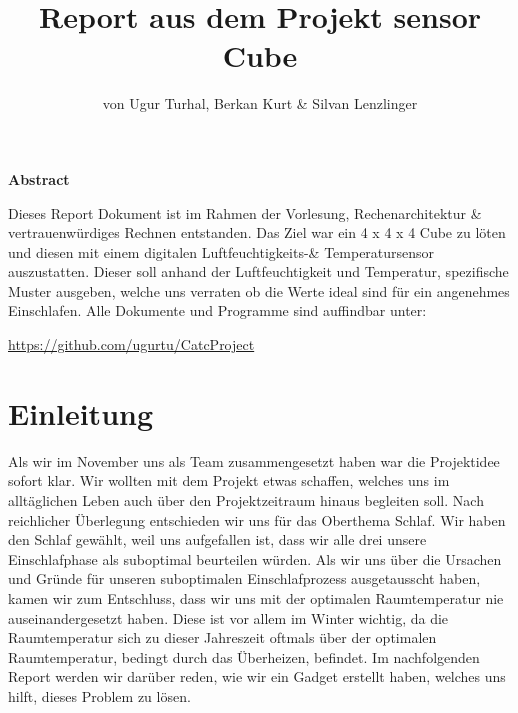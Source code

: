\documentclass{article}
\title{Report aus dem Projekt sensor Cube}
\author{von Ugur Turhal, Berkan Kurt \& Silvan Lenzlinger}
\begin{document}
\maketitle
\tableofcontents
{}
\newpage
\begin{center}
\textbf{Abstract}
\end{center}
Dieses Report Dokument ist im Rahmen der Vorlesung, Rechenarchitektur \& vertrauenwürdiges Rechnen entstanden. Das Ziel war ein 4 x 4 x 4  Cube zu löten und diesen mit einem digitalen Luftfeuchtigkeits-\& Temperatursensor auszustatten.
Dieser soll anhand der Luftfeuchtigkeit und Temperatur, spezifische Muster ausgeben, welche uns verraten ob die Werte ideal sind für ein angenehmes Einschlafen. Alle Dokumente und Programme sind auffindbar unter: \begin{center}
\faGithub \text { }  \url{https://github.com/ugurtu/CatcProject}
\end{center}

\section{Einleitung}
Als wir im November uns als Team zusammengesetzt haben war die Projektidee sofort klar. Wir wollten mit dem Projekt etwas schaffen, welches uns im alltäglichen Leben auch über den Projektzeitraum hinaus begleiten soll.
Nach reichlicher Überlegung entschieden wir uns für das Oberthema Schlaf. Wir haben den Schlaf gewählt, weil uns aufgefallen ist, dass wir alle drei unsere Einschlafphase als suboptimal beurteilen würden. Als wir uns über die Ursachen und Gründe für unseren suboptimalen Einschlafprozess ausgetausscht haben, kamen wir zum Entschluss, dass wir uns mit der optimalen Raumtemperatur nie auseinandergesetzt haben. Diese ist vor allem im Winter wichtig, da die Raumtemperatur sich zu dieser Jahreszeit oftmals über der optimalen Raumtemperatur, bedingt durch das Überheizen, befindet. Im nachfolgenden Report werden wir darüber reden, wie wir ein Gadget erstellt haben, welches uns hilft, dieses Problem zu lösen.
\end{document}
